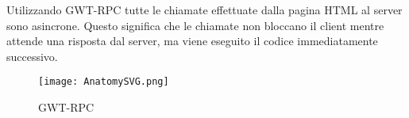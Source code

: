 
Utilizzando  GWT-RPC  tutte  le  chiamate  effettuate  dalla  pagina  HTML  al  server 
sono  asincrone.
Questo  significa  che  le  chiamate  non  bloccano  il  client  mentre attende   una 
risposta   dal   server,   ma   viene  eseguito   il   codice   immediatamente 
successivo.
\FloatBarrier
\begin{figure}[!htb]
\centering%
\texttt{[image: AnatomySVG.png]}%
\caption{GWT-RPC }\label{fig:GWT-RPC}%
\end{figure}

